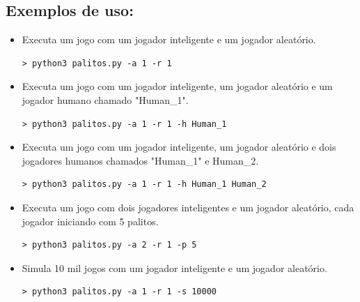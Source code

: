 \documentclass{article}
\begin{document}
\subsection{Exemplos de uso:}

\begin{itemize}

\item Executa um jogo com um jogador inteligente e um jogador aleatório.
\begin{verbatim}
> python3 palitos.py -a 1 -r 1
\end{verbatim}


\item Executa um jogo com um jogador inteligente, um jogador aleatório e um jogador humano chamado "Human\_1".
\begin{verbatim}
> python3 palitos.py -a 1 -r 1 -h Human_1
\end{verbatim}

\item Executa um jogo com um jogador inteligente, um jogador aleatório e dois jogadores humanos chamados "Human\_1" e Human\_2.
\begin{verbatim}
> python3 palitos.py -a 1 -r 1 -h Human_1 Human_2
\end{verbatim}

\item Executa um jogo com dois jogadores inteligentes e um jogador aleatório, cada jogador iniciando com 5 palitos.
\begin{verbatim}
> python3 palitos.py -a 2 -r 1 -p 5
\end{verbatim}

\item Simula 10 mil jogos com um jogador inteligente e um jogador aleatório.
\begin{verbatim}
> python3 palitos.py -a 1 -r 1 -s 10000
\end{verbatim}

\end{itemize}
\end{document}
